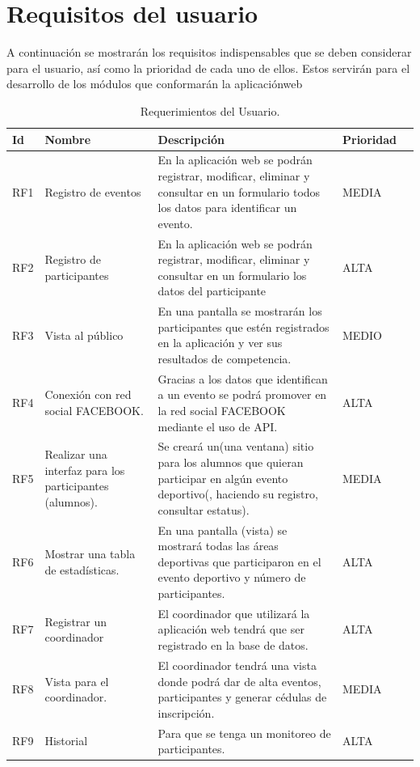 \section{Requisitos del usuario}
A continuación se mostrarán los requisitos indispensables que se deben considerar para el usuario, así como la prioridad de cada uno de ellos. Estos servirán para el desarrollo de los módulos que conformarán la aplicaciónweb 
\begin{table}[htbp]
	\begin{center}
		\begin{tabular}{|l|p{45mm}|p{45mm}|p{45mm}|l}
			\hline
			Id & Nombre & Descripción & Prioridad \\
			\hline 
			RF1 & Registro de eventos & En la aplicación web se podrán registrar, modificar, eliminar y consultar  en un formulario todos los datos para identificar un evento.
			& MEDIA \\ \hline
			RF2 & Registro de participantes & En la aplicación web se podrán registrar, modificar, eliminar y consultar  en un formulario los datos del participante & ALTA  \\ \hline
			RF3 & Vista al público & En una pantalla se mostrarán los participantes que estén registrados en la aplicación y ver sus resultados de competencia. & MEDIO \\ \hline
			RF4 & Conexión con red social FACEBOOK. & Gracias a los datos que identifican a un evento se podrá promover en la red social FACEBOOK mediante el uso de API.& ALTA \\ \hline
			RF5 & Realizar una interfaz para los participantes (alumnos). &Se creará un(una ventana)  sitio para los alumnos que quieran participar en algún evento deportivo(, haciendo su registro, consultar estatus). & MEDIA \\ \hline
			RF6 & Mostrar una tabla de estadísticas. & En una pantalla (vista)  se mostrará todas las áreas deportivas que participaron en el evento deportivo y  número de participantes. & ALTA \\ \hline
			RF7 & Registrar un coordinador & El coordinador que utilizará la aplicación web tendrá que ser registrado en la base de datos. & ALTA \\ \hline
			RF8 & Vista para el coordinador. &El coordinador tendrá una vista donde podrá dar de alta eventos, participantes y generar cédulas de inscripción. & MEDIA \\ \hline
			RF9  & Historial & Para que se tenga un monitoreo de participantes. & ALTA \\ \hline
		\end{tabular}
		\caption{Requerimientos del Usuario.}
		\label{tabla:sencilla}
	\end{center}
\end{table}
\pagebreak

